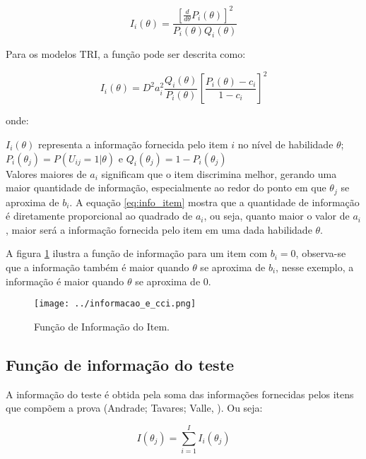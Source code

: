 \[
		I_i(\theta) = \dfrac{[\frac{d}{d\theta}P_i(\theta)]^2}{P_i(\theta)Q_i(\theta)}
\]

Para os modelos TRI, a função pode ser descrita como:

\begin{equation}\label{eq:info_item}
	I_i(\theta) = D^2 a_i^2\frac{Q_i(\theta)}{P_i(\theta)} \left[\frac{P_i(\theta) - c_i}{1 - c_i}\right]^2
\end{equation}

onde:

\noindent $I_i(\theta) $ representa a informação fornecida pelo item $i$ no nível de habilidade $\theta$;\\

\noindent $P_i(\theta_j) = P(U_{ij} = 1| \theta) $ e $ Q_i(\theta_j) = 1 - P_i(\theta_j) $ \\

Valores maiores de $a_i$ significam que o item discrimina melhor, gerando uma maior quantidade de informação, especialmente ao redor do ponto em que $\theta_j$ se aproxima de $b_i$. A equação \ref{eq:info_item} mostra que a quantidade de informação é diretamente proporcional ao quadrado de $a_i$, ou seja, quanto maior o valor de $a_i$, maior será a informação fornecida pelo item em uma dada habilidade $\theta$.

A figura \ref{fig:fii} ilustra a função de informação para um item com $b_i = 0$, observa-se que a informação também é maior quando $\theta$ se aproxima de $b_i$, nesse exemplo, a informação é maior quando $\theta$ se aproxima de $0$.

\begin{figure}[H]
	\centering
	\caption{Função de Informação do Item.}
	\texttt{[image: ../informacao\_e\_cci.png]}
		\parbox{\textwidth}{
		\centering %
	}
	\label{fig:fii}
\end{figure}

\subsection{Função de informação do teste}

A informação do teste é obtida pela soma das informações fornecidas pelos itens que compõem a prova (Andrade; Tavares; Valle, \citeyear{de2000teoria}). Ou seja:

\begin{equation}\label{eq:info_teste}
I(\theta_j) = \sum_{i=1}^{I}I_i(\theta_j)
\end{equation}

